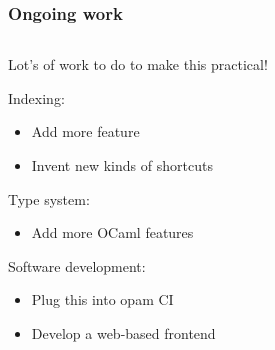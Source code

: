 \documentclass[aspectratio=169,dvipsnames,svgnames,10pt]{beamer}
\begin{document}
\begin{frame}
  \frametitle{Ongoing work}

  \begin{columns}
    \raggedleft
    \begin{column}{0.4\textwidth}
      
    Lot's of work to do to make this practical!

    \vspace{1em}
    Indexing:
    \begin{itemize}
    \item Add more feature
    \item Invent new kinds of shortcuts
    \end{itemize}
    \vspace{1em}

    Type system:\\
    \begin{itemize}
    \item Add more OCaml features
    \end{itemize}

    \vspace{1em}
    
    Software development:
    \begin{itemize}
    \item Plug this into opam CI
    \item Develop a web-based frontend
    \end{itemize}
    \end{column}
        

\end{columns}
\end{frame}
\end{document}
